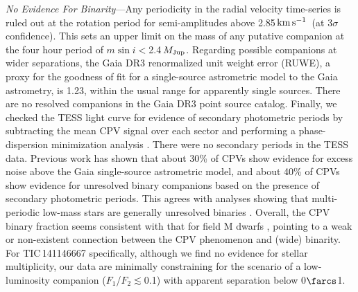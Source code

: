 \documentclass[11pt,twocolumn,tighten,linenumbers]{aastex7}
\newcommand{\kms}{\ensuremath{\rm km\,s^{-1}}}
\begin{document}

{\it No Evidence For Binarity}---Any periodicity in the radial
velocity time-series is ruled out at the rotation period for
semi-amplitudes above 2.85\,\kms\ (at 3$\sigma$ confidence).  This
sets an upper limit on the mass of any putative companion at the four
hour period of $m \sin i $$<$2.4\,$M_{\rm Jup}$.  Regarding possible
companions at wider separations, the Gaia DR3 renormalized unit weight
error (RUWE), a proxy for the goodness of fit for a single-source
astrometric model to the Gaia astrometry, is 1.23, within the usual
range for apparently single sources.  There are no resolved companions
in the Gaia DR3 point source catalog.  Finally, we checked the TESS
light curve for evidence of secondary photometric periods by
subtracting the mean CPV signal over each sector and performing a
phase-dispersion minimization analysis
\citep{Stellingwerf1978,2021zndo...1011188B}.  There were no secondary
periods in the TESS data.  Previous work \citep{Bouma2024} has shown
that about 30\% of CPVs show evidence for excess noise above the Gaia
single-source astrometric model, and about 40\% of CPVs show evidence
for unresolved binary companions based on the presence of secondary
photometric periods.  This agrees with analyses showing that
multi-periodic low-mass stars are generally unresolved binaries
\citep{Tokovinin2018}.  Overall, the CPV binary fraction seems
consistent with that for field M dwarfs \citep{Winters2019}, pointing
to a weak or non-existent connection between the CPV phenomenon and
(wide) binarity.  For TIC\,141146667 specifically, although we find no
evidence for stellar multiplicity, our data are minimally constraining
for the scenario of a low-luminosity companion
($F_1$/$F_2$$\lesssim$0.1) with apparent separation below 0$\farcs$1.
\end{document}
